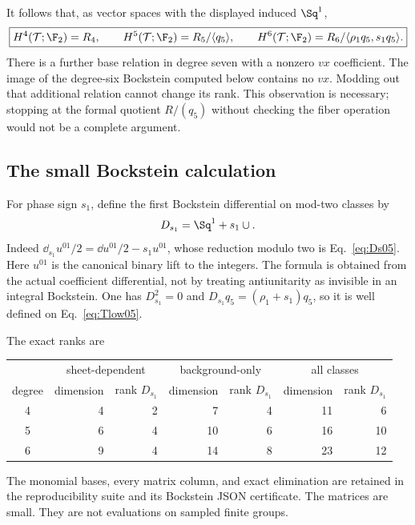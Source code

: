 It follows that, as vector spaces with the displayed induced $\Sq^1$,
\begin{equation}\label{eq:Tlow05}
 \boxed{
 H^4(\mathcal T;\F_2)=R_4,\qquad
 H^5(\mathcal T;\F_2)=R_5/\langle q_5\rangle,\qquad
 H^6(\mathcal T;\F_2)=R_6/\langle {\rho_1}q_5,{s_1}q_5\rangle.}
\end{equation}
There is a further base relation in degree seven with a nonzero $vx$ coefficient. The image of the degree-six Bockstein computed below contains no $vx$. Modding out that additional relation cannot change its rank. This observation is necessary; stopping at the formal quotient $R/(q_5)$ without checking the fiber operation would not be a complete argument.


\subsection{The small Bockstein calculation}
For phase sign ${s_1}$, define the first Bockstein differential on mod-two classes by
\begin{equation}\label{eq:Ds05}
 D_{s_1}=\Sq^1+{s_1}\cup.
\end{equation}
Indeed $\dd_{s_1}u^{01}/2=\dd u^{01}/2-{s_1}u^{01}$, whose reduction modulo two is Eq.~\eqref{eq:Ds05}. Here $u^{01}$ is the canonical binary lift to the integers. The formula is obtained from the actual coefficient differential, not by treating antiunitarity as invisible in an integral Bockstein. One has $D_{s_1}^2=0$ and $D_{s_1}q_5=(\rho_1+s_1)q_5$, so it is well defined on Eq.~\eqref{eq:Tlow05}.

The exact ranks are
\begin{center}
\begin{tabular}{c|rr|rr|rr}\toprule
 &\multicolumn{2}{c|}{sheet-dependent}&\multicolumn{2}{c|}{background-only}&\multicolumn{2}{c}{all classes}\\
 degree & dimension & rank $D_{s_1}$ & dimension & rank $D_{s_1}$ & dimension & rank $D_{s_1}$\\\midrule
 4&4&2&7&4&11&6\\
 5&6&4&10&6&16&10\\
 6&9&4&14&8&23&12\\\bottomrule
\end{tabular}
\end{center}
The monomial bases, every matrix column, and exact elimination are retained in the reproducibility suite and its Bockstein JSON certificate. The matrices are small. They are not evaluations on sampled finite groups.

